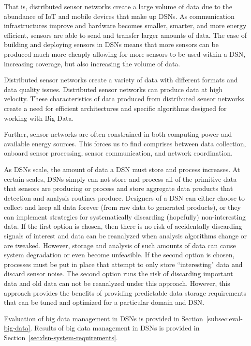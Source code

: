 That is, distributed sensor networks create a large volume of data due to the abundance of IoT and mobile devices that make up DSNs. As communication infrastructures improve and hardware becomes smaller, smarter, and more energy efficient, sensors are able to send and transfer larger amounts of data. The ease of building and deploying sensors in DSNs means that more sensors can be produced much more cheaply allowing for more sensors to be used within a DSN, increasing coverage, but also increasing the volume of data.

Distributed sensor networks create a variety of data with different formats and data quality issues. Distributed sensor networks can produce data at high velocity. These characteristics of data produced from distributed sensor networks create a need for efficient architectures and specific algorithms designed for working with Big Data.

Further, sensor networks are often constrained in both computing power and available energy sources. This forces us to find comprises between data collection, onboard sensor processing, sensor communication, and network coordination.

As DSNs scale, the amount of data a DSN must store and process increases. At certain scales, DSNs simply can not store and process all of the primitive data that sensors are producing or process and store aggregate data products that detection and analysis routines produce. Designers of a DSN can either choose to collect and keep all data forever (from raw data to generated products), or they can implement strategies for systematically discarding (hopefully) non-interesting data. If the first option is chosen, then there is no risk of accidentally discarding signals of interest and data can be reanalyzed when analysis algorithms change or are tweaked. However, storage and analysis of such amounts of data can cause system degradation or even become unfeasible. If the second option is chosen, processes must be put in place that attempt to only store ``interesting" data and discard sensor noise.  The second option runs the risk of discarding important data and old data can not be reanalyzed under this approach. However, this approach provides the benefits of providing predictable data storage requirements that can be tuned and optimized for a particular domain and DSN.

Evaluation of big data management in DSNs is provided in Section~\ref{subsec:eval-big-data}. Results of big data management in DSNs is provided in Section~\ref{sec:dsn-system-requirements}.

